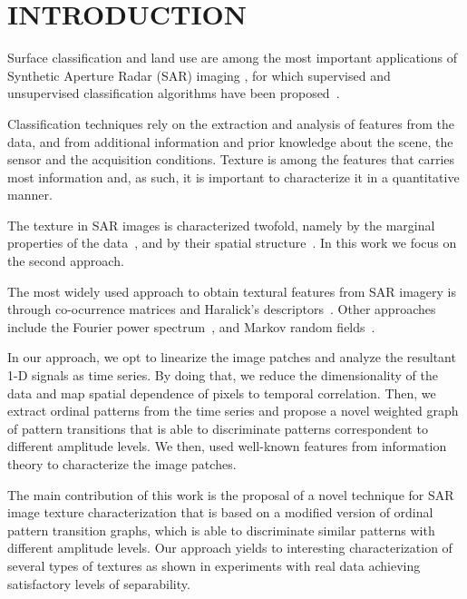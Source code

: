 \documentclass{isprs}
\begin{document}
\section{INTRODUCTION}\label{Intro}

Surface classification and land use are among the most important applications of Synthetic Aperture Radar (SAR) imaging \cite{Pottier2004Unsupervised}, for which supervised and unsupervised classification algorithms have been proposed~\cite{Bhattacharya2018Unsupervised,Chen1996multifrequency,ZYL1992Bayesian}.

Classification techniques rely on the extraction and analysis of features from the data, and from additional information and prior knowledge about  the scene, the sensor and the acquisition conditions.
Texture is among the features that carries most information and, as such, it is important to characterize it in a quantitative manner.

The texture in SAR images is characterized twofold, namely by the marginal properties of the data~\cite{adrian96}, and by their spatial structure~\cite{FeaturesCropDiscrimination}.
In this work we focus on the second approach.

The most widely used approach to obtain textural features from SAR imagery is through co-ocurrence matrices and Haralick's descriptors~\cite{Zakeri2017Texture}.
Other approaches include the Fourier power spectrum~\cite{Florindo2012Fractal}, and
Markov random fields~\cite{Deng2005UnsupervisedSO}.

{\color{red}
	In our approach, we opt to linearize the image patches and analyze the resultant 1-D signals as time series. 
	By doing that, we reduce the dimensionality of the data and map spatial dependence of pixels to temporal correlation. 
	Then, we extract ordinal patterns from the time series and propose a novel weighted graph of pattern transitions that is able to discriminate patterns correspondent to different amplitude levels. 
	We then, used well-known features from information theory to characterize the image patches. 
	
	The main contribution of this work is the proposal of a novel technique for SAR image texture characterization that is based on a modified version of ordinal pattern transition graphs, which is able to discriminate similar patterns with different amplitude levels. 
	Our approach yields to interesting characterization of several types of textures as shown in experiments with real data achieving satisfactory levels of separability.
}
\end{document}
